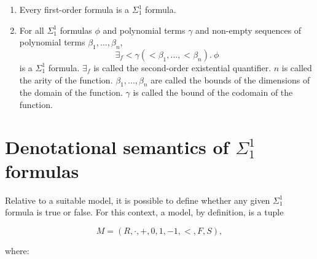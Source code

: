 \documentclass[11pt]{article}
\begin{document}
\begin{enumerate}
	\item Every first-order formula is a $\Sigma^1_1$ formula.
	\item For all $\Sigma^1_1$ formulas $\phi$ and polynomial terms $\gamma$ and non-empty sequences of polynomial terms $\beta_1, ..., \beta_n$,
		\begin{equation}
			\exists_f <\gamma (<\beta_1, ..., <\beta_n).\ \phi
		\end{equation}
		is a $\Sigma^1_1$ formula. $\exists_f$ is called the second-order existential quantifier. $n$ is called the arity of the function. $\beta_1, ..., \beta_n$ are called the bounds of the dimensions of the domain of the function. $\gamma$ is called the bound of the codomain of the function.
\end{enumerate}



\section{Denotational semantics of $\Sigma^1_1$ formulas}

Relative to a suitable model, it is possible to define whether any given
$\Sigma^1_1$ formula is true or false.
For this context, a model, by definition, is a tuple

\begin{equation}
	M = (R, \cdot, +, 0, 1, -1, <, F, S),
\end{equation}

where:
\end{document}
